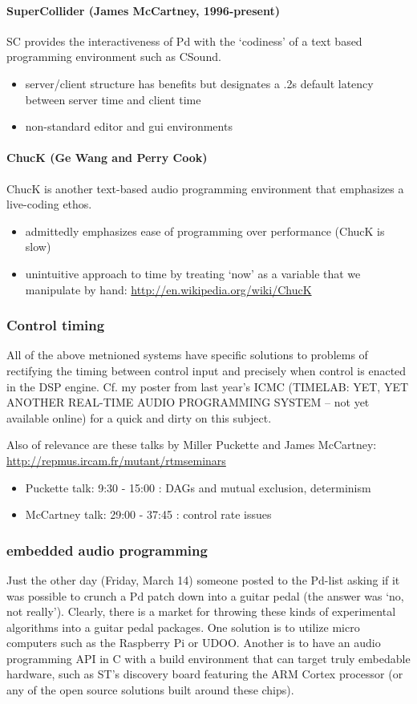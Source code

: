 \documentclass{article}
\begin{document}
\paragraph{SuperCollider (James McCartney, 1996-present)}
SC provides the interactiveness of Pd with the `codiness' of a text based programming environment such as CSound.
\begin{itemize}
\item server/client structure has benefits but designates a .2s default latency between server time and client time%
\item non-standard editor and gui environments 
\end{itemize}

\paragraph{ChucK (Ge Wang and Perry Cook)}
ChucK is another text-based audio programming environment that emphasizes a live-coding ethos. 
\begin{itemize}
\item admittedly emphasizes ease of programming over performance (ChucK is slow)
\item unintuitive approach to time by treating `now' as a variable that we manipulate by hand: \url{http://en.wikipedia.org/wiki/ChucK}
\end{itemize}

\subsubsection{Control timing}
All of the above metnioned systems have specific solutions to problems of rectifying the timing between control input and precisely when control is enacted in the DSP engine. Cf. my poster from last year's ICMC (TIMELAB: YET, YET ANOTHER REAL-TIME AUDIO PROGRAMMING SYSTEM -- not yet available online) for a quick and dirty on this subject.

Also of relevance are these talks by Miller Puckette and James McCartney:
\url{http://repmus.ircam.fr/mutant/rtmseminars}
\begin{itemize}
\item Puckette talk: 9:30 - 15:00 : DAGs and mutual exclusion, determinism
\item McCartney talk: 29:00 - 37:45 : control rate issues
\end{itemize}

\subsubsection{embedded audio programming}
Just the other day (Friday, March 14) someone posted to the Pd-list asking if it was possible to crunch a Pd patch down into a guitar pedal (the answer was `no, not really'). Clearly, there is a market for throwing these kinds of experimental algorithms into a guitar pedal packages. One solution is to utilize micro computers such as the Raspberry Pi or UDOO. Another is to have an audio programming API in C with a build environment that can target truly embedable hardware, such as ST's discovery board featuring the ARM Cortex processor (or any of the open source solutions built around these chips).
\end{document}
